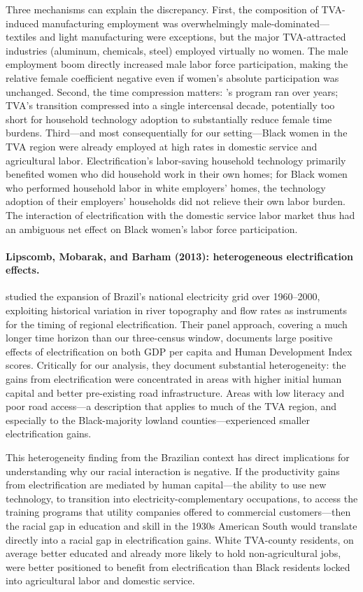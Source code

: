 \documentclass[12pt]{article}
\begin{document}
Three mechanisms can explain the discrepancy. First, the composition of TVA-induced manufacturing employment was overwhelmingly male-dominated---textiles and light manufacturing were exceptions, but the major TVA-attracted industries (aluminum, chemicals, steel) employed virtually no women. The male employment boom directly increased male labor force participation, making the relative female coefficient negative even if women's absolute participation was unchanged. Second, the time compression matters: \citeauthor{dinkelman2011}'s program ran over years; TVA's transition compressed into a single intercensal decade, potentially too short for household technology adoption to substantially reduce female time burdens. Third---and most consequentially for our setting---Black women in the TVA region were already employed at high rates in domestic service and agricultural labor. Electrification's labor-saving household technology primarily benefited women who did household work in their own homes; for Black women who performed household labor in white employers' homes, the technology adoption of their employers' households did not relieve their own labor burden. The interaction of electrification with the domestic service labor market thus had an ambiguous net effect on Black women's labor force participation.

\paragraph{Lipscomb, Mobarak, and Barham (2013): heterogeneous electrification effects.} \citet{lipscomb2013} studied the expansion of Brazil's national electricity grid over 1960--2000, exploiting historical variation in river topography and flow rates as instruments for the timing of regional electrification. Their panel approach, covering a much longer time horizon than our three-census window, documents large positive effects of electrification on both GDP per capita and Human Development Index scores. Critically for our analysis, they document substantial heterogeneity: the gains from electrification were concentrated in areas with higher initial human capital and better pre-existing road infrastructure. Areas with low literacy and poor road access---a description that applies to much of the TVA region, and especially to the Black-majority lowland counties---experienced smaller electrification gains.

This heterogeneity finding from the Brazilian context has direct implications for understanding why our racial interaction is negative. If the productivity gains from electrification are mediated by human capital---the ability to use new technology, to transition into electricity-complementary occupations, to access the training programs that utility companies offered to commercial customers---then the racial gap in education and skill in the 1930s American South would translate directly into a racial gap in electrification gains. White TVA-county residents, on average better educated and already more likely to hold non-agricultural jobs, were better positioned to benefit from electrification than Black residents locked into agricultural labor and domestic service.
\end{document}
